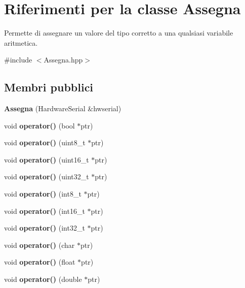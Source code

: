 \hypertarget{class_assegna}{}\section{Riferimenti per la classe Assegna}
\label{class_assegna}


Permette di assegnare un valore del tipo corretto a una qualsiasi variabile aritmetica.  




{\ttfamily \#include $<$Assegna.\+hpp$>$}

\subsection*{Membri pubblici}
\begin{DoxyCompactItemize}
\item 
\mbox{\label{class_assegna_a66e1384a62510098ae980d2459dcc515}} 
{\bfseries Assegna} (Hardware\+Serial \&hwserial)
\item 
\mbox{\label{class_assegna_af73ceecd7402d5f580d834a50da4ba02}} 
void {\bfseries operator()} (bool $\ast$ptr)
\item 
\mbox{\label{class_assegna_af2c057941eb9e36451cfbadd2870bf1e}} 
void {\bfseries operator()} (uint8\+\_\+t $\ast$ptr)
\item 
\mbox{\label{class_assegna_a617f396b9c6e0b57daf0c2260ec7045b}} 
void {\bfseries operator()} (uint16\+\_\+t $\ast$ptr)
\item 
\mbox{\label{class_assegna_aedc0e576f19a465cadf87923df1a815d}} 
void {\bfseries operator()} (uint32\+\_\+t $\ast$ptr)
\item 
\mbox{\label{class_assegna_abcf5180cd65bf7f837c0ad2f93240807}} 
void {\bfseries operator()} (int8\+\_\+t $\ast$ptr)
\item 
\mbox{\label{class_assegna_a0bb43f452e3de3e3600c108d3ac24dd2}} 
void {\bfseries operator()} (int16\+\_\+t $\ast$ptr)
\item 
\mbox{\label{class_assegna_acdac6628bc61b368ebc3498f7f841772}} 
void {\bfseries operator()} (int32\+\_\+t $\ast$ptr)
\item 
\mbox{\label{class_assegna_a5851ae575490d2589ee5cd3c8ec09d6f}} 
void {\bfseries operator()} (char $\ast$ptr)
\item 
\mbox{\label{class_assegna_a6d50cfe9292d81efef4da9ba8a8278e0}} 
void {\bfseries operator()} (float $\ast$ptr)
\item 
\mbox{\label{class_assegna_a7636492e8c3fd23508f6a47b7e8a75ad}} 
void {\bfseries operator()} (double $\ast$ptr)
\end{DoxyCompactItemize}


